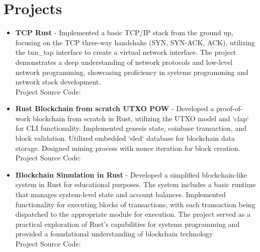 \documentclass[11pt,a4paper,sans]{moderncv}
\begin{document}
\section{Projects}
\begin{itemize}[label=\textbullet]
    \item \textbf{TCP Rust} - Implemented a basic TCP/IP stack from the ground up, focusing on the TCP three-way handshake (SYN, SYN-ACK, ACK), utilizing the tun\_tap interface to create a virtual network interface. The project demonstrates a deep understanding of network protocols and low-level network programming, showcasing proficiency in systems programming and network stack development. \\
          Project Source Code: \textcolor{blue}{\href{https://github.com/noormohammedb/rust-tcp-implementation/}{}}

    \item \textbf{Rust Blockchain from scratch UTXO POW} - Developed a proof-of-work blockchain from scratch in Rust, utilizing the UTXO model and `clap` for CLI functionality. Implemented genesis state, coinbase transaction, and block validation. Utilized embedded `sled` database for blockchain data storage. Designed mining process with nonce iteration for block creation. \\
          Project Source Code: \textcolor{blue}{\href{https://github.com/noormohammedb/blockchain-pow-from-scratch-rust-utxo/}{}}


    \item \textbf{Blockchain Simulation in Rust} - Developed a simplified blockchain-like system in Rust for educational purposes. The system includes a basic runtime that manages system-level state and account balances. Implemented functionality for executing blocks of transactions, with each transaction being dispatched to the appropriate module for execution. The project served as a practical exploration of Rust’s capabilities for systems programming and provided a foundational understanding of blockchain technology  \\
          Project Source Code: \textcolor{blue}{\href{https://github.com/noormohammedb/rust-state-machine/}{}}

\end{itemize}
\end{document}
